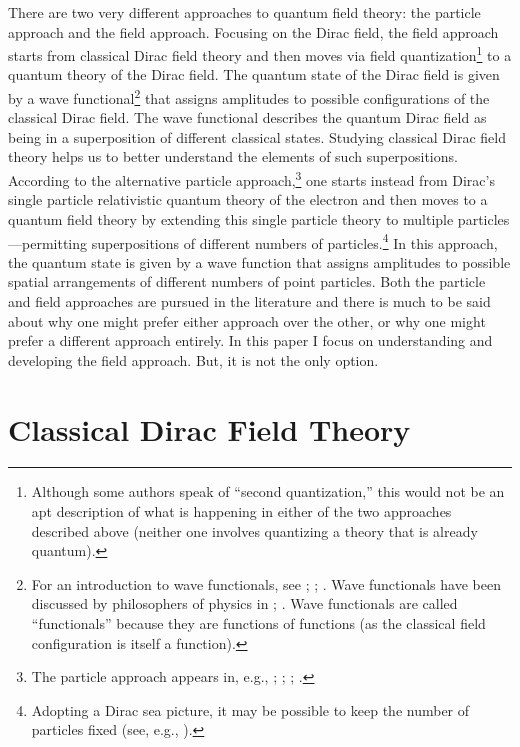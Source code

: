 \documentclass[onecolumn,secnumarabic,amsmath,amssymb,balancelastpage,nofootinbib]{article}
\begin{document}
There are two very different approaches to quantum field theory: the particle approach and the field approach.  Focusing on the Dirac field, the field approach starts from classical Dirac field theory and then moves via field quantization\footnote{Although some authors speak of ``second quantization,'' this would not be an apt description of what is happening in either of the two approaches described above (neither one involves quantizing a theory that is already quantum).} to a quantum theory of the Dirac field.  The quantum state of the Dirac field is given by a wave functional\footnote{For an introduction to wave functionals, see \citet{jackiw1988, jackiw1990, hatfield}; \citet[ch.\ 11]{bohmhiley}; \citet[sec.\ 12.4]{holland}.  Wave functionals have been discussed by philosophers of physics in \citet{huggett2000, wallace2001, wallace2006, wallace2017, baker2009}; \citet[sec.\ 4.3.1]{myrvold2015}.  Wave functionals are called ``functionals'' because they are functions of functions (as the classical field configuration is itself a function).} that assigns amplitudes to possible configurations of the classical Dirac field.  The wave functional describes the quantum Dirac field as being in a superposition of different classical states.  Studying classical Dirac field theory helps us to better understand the elements of such superpositions.  According to the alternative particle approach,\footnote{The particle approach appears in, e.g., \citet[ch.\ 6--8]{schweberQFT}; \citet[sec.\ 13.2]{bjorkendrellfields}; \citet{thaller1992}; \citet[ch.\ 3]{teller}.} one starts instead from Dirac's single particle relativistic quantum theory of the electron and then moves to a quantum field theory by extending this single particle theory to multiple particles---permitting superpositions of different numbers of particles.\footnote{Adopting a Dirac sea picture, it may be possible to keep the number of particles fixed (see, e.g., \citealp{deckert}).}  In this approach, the quantum state is given by a wave function that assigns amplitudes to possible spatial arrangements of different numbers of point particles.   Both the particle and field approaches are pursued in the literature and there is much to be said about why one might prefer either approach over the other, or why one might prefer a different approach entirely.  In this paper I focus on understanding and developing the field approach.  But, it is not the only option.





\section{Classical Dirac Field Theory}\label{CDFT}
\end{document}
